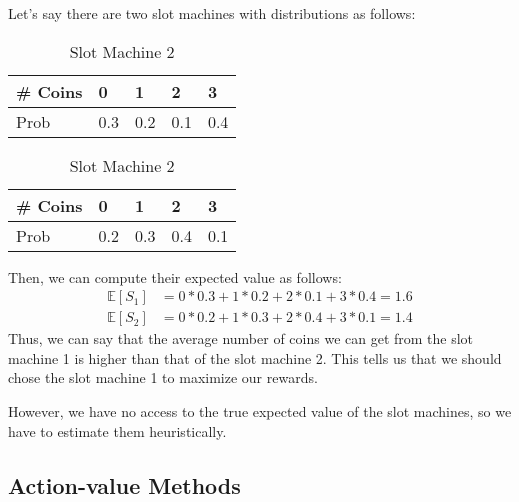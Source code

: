 Let's say there are two slot machines with distributions as follows:
\begin{table}[h]
\begin{minipage}{0.5\textwidth}
\centering
\begin{tabular}{lllll}
\toprule
\# Coins & 0   & 1   & 2   & 3  \\
\midrule
Prob     & 0.3 & 0.2 & 0.1 & 0.4\\
\bottomrule
\end{tabular}
\caption{Slot Machine 1}
\end{minipage}%
\begin{minipage}{0.5\textwidth}
\centering
\begin{tabular}{lllll}
\toprule
\# Coins & 0   & 1   & 2   & 3  \\
\midrule
Prob     & 0.2 & 0.3 & 0.4 & 0.1\\
\bottomrule
\end{tabular}
\caption{Slot Machine 2}
\end{minipage}
\end{table}
Then, we can compute their expected value as follows:
\begin{align*}
	\mathbb{E}[S_1]&= 0*0.3+1*0.2+2*0.1+3*0.4 = 1.6 \\
	\mathbb{E}[S_2]&= 0*0.2+1*0.3+2*0.4+3*0.1 = 1.4
\end{align*}
Thus, we can say that the average number of coins we can get from the slot machine 1 is higher than that of the slot machine 2. This tells us that we should chose the slot machine 1 to maximize our rewards. 

However, we have no access to the true expected value of the slot machines, so we have to estimate them heuristically. 







\subsection{Action-value Methods}

